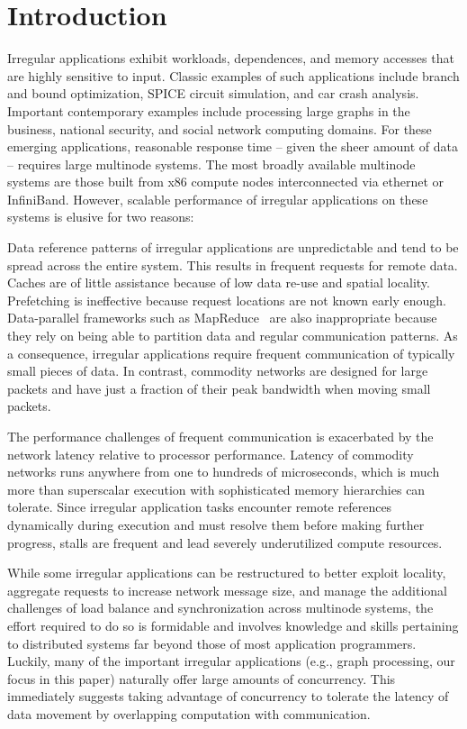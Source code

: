 \section{Introduction} \label{sec:intro}

Irregular applications exhibit workloads, dependences, and memory accesses
that are highly sensitive to input. Classic examples of such applications
include branch and bound optimization, SPICE circuit simulation, and car crash
analysis. Important contemporary examples include processing large graphs in
the business, national security, and social network computing domains. For
these emerging applications, reasonable response time -- given the sheer
amount of data -- requires large multinode systems. The most broadly available
multinode systems are those built from x86 compute nodes interconnected via
ethernet or InfiniBand. However, scalable performance of irregular
applications on these systems is elusive for two reasons:

 Data reference
patterns of irregular applications are unpredictable and tend to be spread
across the entire system. This results in frequent requests for remote data.
Caches are of little assistance because of low data re-use and spatial
locality. Prefetching is ineffective because request locations are not known
early enough. Data-parallel frameworks such as
MapReduce~\cite{mapreduce:osdi04} are also inappropriate because they rely on
being able to partition data and regular communication patterns. As a
consequence, irregular applications require frequent communication of
typically small pieces of data. In contrast, commodity networks are designed
for large packets and have just a fraction of their peak bandwidth when moving
small packets.

 The performance challenges
of frequent communication is exacerbated by the network latency relative to
processor performance. Latency of commodity networks runs anywhere from one to
hundreds of microseconds, which is much more than superscalar execution with
sophisticated memory hierarchies can tolerate. Since irregular application
tasks encounter remote references dynamically during execution and must
resolve them before making further progress, stalls are frequent and lead
severely underutilized compute resources.

While some irregular applications can be restructured to better exploit
locality, aggregate requests to increase network message size, and manage the
additional challenges of load balance and synchronization across multinode
systems, the effort required to do so is formidable and involves knowledge and
skills pertaining to distributed systems far beyond those of most application
programmers. Luckily, many of the important irregular applications (e.g.,
graph processing, our focus in this paper) naturally offer large amounts of
concurrency. This immediately suggests taking advantage of concurrency to
tolerate the latency of data movement by overlapping computation with
communication.

